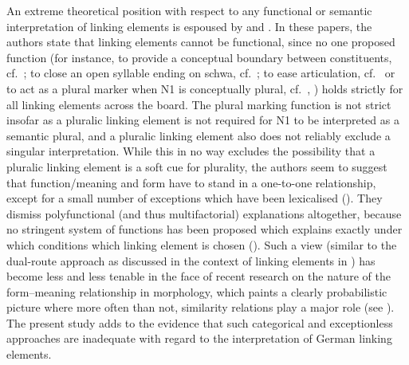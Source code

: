 An extreme theoretical position with respect to any functional or semantic interpretation of linking elements is espoused by \textcite{NeefBorgwaldt2012} and \textcite{Neef2015}.
In these papers, the authors state that linking elements cannot be functional, since no one proposed function (for instance, to provide a conceptual boundary between constituents, cf.\ \citealt[530]{Fuhrhop1996}; to close an open syllable ending on schwa, cf.\ \citealt[446]{Wegener2003}; to ease articulation, cf.\ \citealt[177]{Wegener2005} or to act as a plural marker when N1 is conceptually plural, cf.\ \citealt[534]{Fuhrhop1996}, \citealt[427]{Wegener2003}) holds strictly for all linking elements across the board.
The plural marking function is not strict insofar as a pluralic linking element is not required for N1 to be interpreted as a semantic plural, and a pluralic linking element also does not reliably exclude a singular interpretation.
While this in no way excludes the possibility that a pluralic linking element is a soft cue for plurality, the authors seem to suggest that function\slash meaning and form have to stand in a one-to-one relationship, except for a small number of exceptions which have been lexicalised (\egg \citealt[42]{NeefBorgwaldt2012}).
They dismiss polyfunctional (and thus multifactorial) explanations altogether, because no stringent system of functions has been proposed which explains exactly under which conditions which linking element is chosen (\egg \citealt[27--29]{NeefBorgwaldt2012}).
Such a view (similar to the dual-route approach as discussed in the context of linking elements in \citealt{KrottEa2007}) has become less and less tenable in the face of recent research on the nature of the form--meaning relationship in morphology, which paints a clearly probabilistic picture where more often than not, similarity relations play a major role (see \citealt[107]{ArndtlappeEa2016}).
The present study adds to the evidence that such categorical and exceptionless approaches are inadequate with regard to the interpretation of German linking elements.


